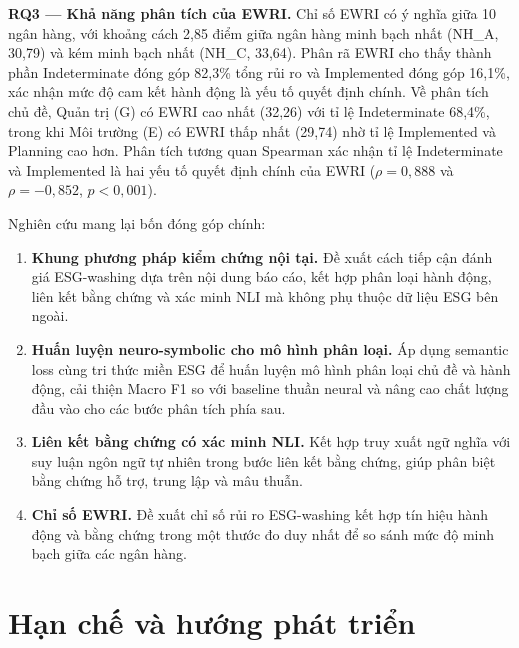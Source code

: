 \textbf{RQ3 --- Khả năng phân tích của EWRI.} Chỉ số EWRI có ý nghĩa giữa 10 ngân hàng, với khoảng cách 2,85 điểm giữa ngân hàng minh bạch nhất (NH\_A, 30,79) và kém minh bạch nhất (NH\_C, 33,64). Phân rã EWRI cho thấy thành phần Indeterminate đóng góp 82,3\% tổng rủi ro và Implemented đóng góp 16,1\%, xác nhận mức độ cam kết hành động là yếu tố quyết định chính. Về phân tích chủ đề, Quản trị (G) có EWRI cao nhất (32,26) với tỉ lệ Indeterminate 68,4\%, trong khi Môi trường (E) có EWRI thấp nhất (29,74) nhờ tỉ lệ Implemented và Planning cao hơn. Phân tích tương quan Spearman xác nhận tỉ lệ Indeterminate và Implemented là hai yếu tố quyết định chính của EWRI ($\rho = 0{,}888$ và $\rho = -0{,}852$, $p < 0{,}001$).

Nghiên cứu mang lại bốn đóng góp chính:

\begin{enumerate}
    \item \textbf{Khung phương pháp kiểm chứng nội tại.} Đề xuất cách tiếp cận đánh giá ESG-washing dựa trên nội dung báo cáo, kết hợp phân loại hành động, liên kết bằng chứng và xác minh NLI mà không phụ thuộc dữ liệu ESG bên ngoài.

    \item \textbf{Huấn luyện neuro-symbolic cho mô hình phân loại.} Áp dụng semantic loss cùng tri thức miền ESG để huấn luyện mô hình phân loại chủ đề và hành động, cải thiện Macro F1 so với baseline thuần neural và nâng cao chất lượng đầu vào cho các bước phân tích phía sau.

    \item \textbf{Liên kết bằng chứng có xác minh NLI.} Kết hợp truy xuất ngữ nghĩa với suy luận ngôn ngữ tự nhiên trong bước liên kết bằng chứng, giúp phân biệt bằng chứng hỗ trợ, trung lập và mâu thuẫn.

    \item \textbf{Chỉ số EWRI.} Đề xuất chỉ số rủi ro ESG-washing kết hợp tín hiệu hành động và bằng chứng trong một thước đo duy nhất để so sánh mức độ minh bạch giữa các ngân hàng.
\end{enumerate}

\section*{Hạn chế và hướng phát triển}

